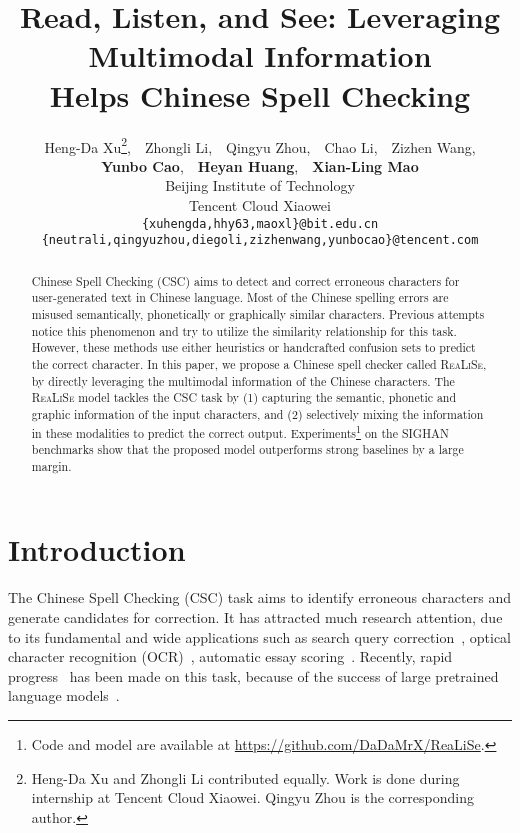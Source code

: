 \documentclass[11pt,a4paper]{article}
\title{Read, Listen, and See: Leveraging Multimodal Information \\ Helps Chinese Spell Checking}
\author{Heng-Da Xu\thanks{\; Heng-Da Xu and Zhongli Li contributed equally. Work is done during internship at Tencent Cloud Xiaowei. Qingyu Zhou is the corresponding author.},~~Zhongli Li,~~Qingyu Zhou,~~Chao Li,~~Zizhen Wang,\\\textbf{Yunbo Cao},~~\textbf{Heyan Huang},~~\textbf{Xian-Ling Mao}
 \\
  Beijing Institute of Technology \\
  Tencent Cloud Xiaowei \\
   \texttt{\{xuhengda,hhy63,maoxl\}@bit.edu.cn} \\
   \texttt{\{neutrali,qingyuzhou,diegoli,zizhenwang,yunbocao\}@tencent.com}
  }
\date{}
\newcommand\model{\textsc{ReaLiSe}}
\begin{document}
\maketitle
\begin{abstract}
Chinese Spell Checking (CSC) aims to detect and correct erroneous characters for user-generated text in Chinese language.
Most of the Chinese spelling errors are misused semantically, phonetically or graphically similar characters.
Previous attempts notice this phenomenon and try to utilize the similarity relationship for this task.
However, these methods use either heuristics or handcrafted confusion sets to predict the correct character.
In this paper, we propose a Chinese spell checker called \model{}, by directly leveraging the multimodal information of the Chinese characters.
The \model{} model tackles the CSC task by (1) capturing the semantic, phonetic and graphic information of the input characters, and (2) selectively mixing the information in these modalities to predict the correct output.
Experiments\footnote{Code and model are available at \url{https://github.com/DaDaMrX/ReaLiSe}.} on the SIGHAN benchmarks show that the proposed model outperforms strong baselines by a large margin.
\end{abstract}

\section{Introduction}

The Chinese Spell Checking (CSC) task aims to identify erroneous characters and generate candidates for correction. It has attracted much research attention, due to its fundamental and wide applications such as search query correction~\cite{app-search,gao-etal-2010}, optical character recognition (OCR)~\cite{afli2016using}, automatic essay scoring~\cite{dong2016automatic}.
Recently, rapid progress~\citep{softmask-spell, spellgcn} has been made on this task, because of the success of large pretrained language models~\citep{bert,roberta,xlnet}.
\end{document}
